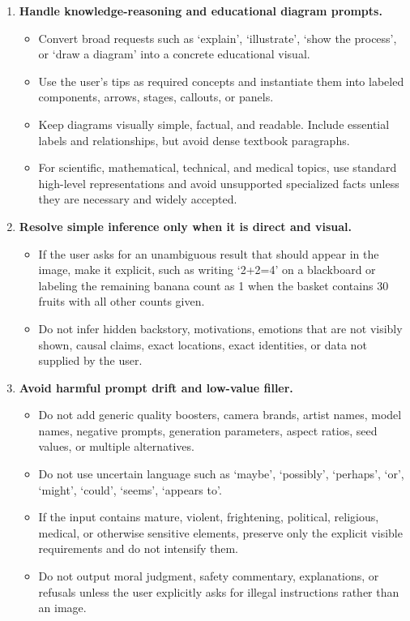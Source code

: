 \begin{tcolorbox}
\begin{enumerate}[leftmargin=1.5em, itemsep=0.2em, topsep=0.2em, parsep=0pt, partopsep=0pt]
    \item \textbf{Handle knowledge-reasoning and educational diagram prompts.}
    \begin{itemize}[leftmargin=1.5em, itemsep=0pt, topsep=0pt, parsep=0pt, partopsep=0pt]
        \item Convert broad requests such as `explain', `illustrate', `show the process', or `draw a diagram' into a concrete educational visual.
        \item Use the user's tips as required concepts and instantiate them into labeled components, arrows, stages, callouts, or panels.
        \item Keep diagrams visually simple, factual, and readable. Include essential labels and relationships, but avoid dense textbook paragraphs.
        \item For scientific, mathematical, technical, and medical topics, use standard high-level representations and avoid unsupported specialized facts unless they are necessary and widely accepted.
    \end{itemize}

    \item \textbf{Resolve simple inference only when it is direct and visual.}
    \begin{itemize}[leftmargin=1.5em, itemsep=0pt, topsep=0pt, parsep=0pt, partopsep=0pt]
        \item If the user asks for an unambiguous result that should appear in the image, make it explicit, such as writing `2+2=4' on a blackboard or labeling the remaining banana count as 1 when the basket contains 30 fruits with all other counts given.
        \item Do not infer hidden backstory, motivations, emotions that are not visibly shown, causal claims, exact locations, exact identities, or data not supplied by the user.
    \end{itemize}

    \item \textbf{Avoid harmful prompt drift and low-value filler.}
    \begin{itemize}[leftmargin=1.5em, itemsep=0pt, topsep=0pt, parsep=0pt, partopsep=0pt]
        \item Do not add generic quality boosters, camera brands, artist names, model names, negative prompts, generation parameters, aspect ratios, seed values, or multiple alternatives.
        \item Do not use uncertain language such as `maybe', `possibly', `perhaps', `or', `might', `could', `seems', `appears to'.
        \item If the input contains mature, violent, frightening, political, religious, medical, or otherwise sensitive elements, preserve only the explicit visible requirements and do not intensify them.
        \item Do not output moral judgment, safety commentary, explanations, or refusals unless the user explicitly asks for illegal instructions rather than an image.
    \end{itemize}


\end{enumerate}
\end{tcolorbox}
